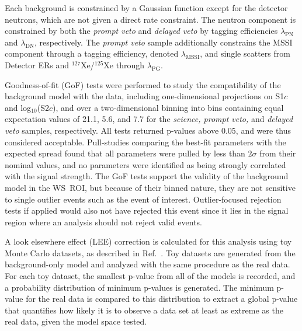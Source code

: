 Each background is constrained by a Gaussian function except for the detector neutrons, which are not given a direct rate constraint.
The neutron component is constrained by both the \emph{prompt veto} and \emph{delayed veto} by tagging efficiencies $\lambda_\text{PN}$ and $\lambda_\text{DN}$, respectively.
The \emph{prompt veto} sample additionally constrains the MSSI component through a tagging efficiency, denoted $\lambda_\text{MSSI}$, and single scatters from Detector ERs and $^{127}$Xe/$^{125}$Xe through $\lambda_\text{PG}$.

Goodness-of-fit (GoF) tests were performed to study the compatibility of the background model with the data, including one-dimensional projections on S1$c$ and log$_{10}$(S2$c$), and over a two-dimensional binning into bins containing equal expectation values of 21.1, 5.6, and 7.7 for the \emph{science, prompt veto,} and \emph{delayed veto} samples, respectively.
All tests returned p-values above 0.05, and were thus considered acceptable. Pull-studies comparing the best-fit parameters with the expected spread found that all parameters were pulled by less than $2\sigma$ from their nominal values, and no parameters were identified as being strongly correlated with the signal strength. 
The GoF tests support the validity of the background model in the WS~ROI, but because of their binned nature, they are not sensitive to single outlier events such as the event of interest. 
Outlier-focused rejection tests if applied would also not have rejected this event since it lies in the signal region where an analysis should not reject valid events.  

A look elsewhere effect (LEE) correction is calculated for this analysis using toy Monte Carlo datasets, as described in Ref.~\cite{DM_parameters:BAXTER2021_Conventions}.
Toy datasets are generated from the background-only model and analyzed with the same procedure as the real data. 
For each toy dataset, the smallest p-value from all of the models is recorded, and a probability distribution of minimum p-values is generated. 
The minimum p-value for the real data is compared to this distribution to extract a global p-value that quantifies how likely it is to observe a data set at least as extreme as the real data, given the model space tested.

